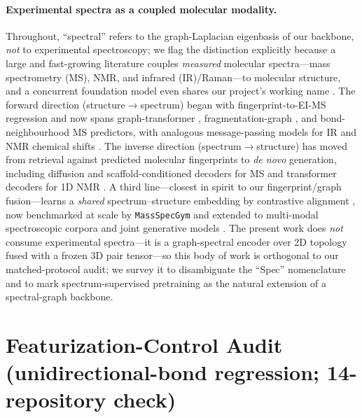 \documentclass[sigconf,nonacm,anonymous,review]{acmart}
\begin{document}
\paragraph{Experimental spectra as a coupled molecular modality.}
Throughout, ``spectral'' refers to the graph-Laplacian eigenbasis of our backbone, \emph{not} to experimental spectroscopy; we flag the distinction explicitly because a large and fast-growing literature couples \emph{measured} molecular spectra---mass spectrometry (MS), NMR, and infrared (IR)/Raman---to molecular structure, and a concurrent foundation model even shares our project's working name \citep{shen2025specmol}. The forward direction (structure$\rightarrow$spectrum) began with fingerprint-to-EI-MS regression \citep{wei2019neims} and now spans graph-transformer \citep{young2024massformer}, fragmentation-graph \citep{goldman2024iceberg,murphy2023graffms,goldman2023scarf}, and bond-neighbourhood \citep{nowatzky2025fiora} MS predictors, with analogous message-passing models for IR \citep{mcgill2021chempropir} and NMR chemical shifts \citep{jonas2019rapidnmr,kwon2020nmrmpnn}. The inverse direction (spectrum$\rightarrow$structure) has moved from retrieval against predicted molecular fingerprints \citep{duhrkop2015csifingerid,goldman2023mist} to \emph{de novo} generation, including diffusion \citep{bohde2025diffms} and scaffold-conditioned \citep{wang2025madgen} decoders for MS and transformer decoders for 1D NMR \citep{hu2024nmrmultitask}. A third line---closest in spirit to our fingerprint/graph fusion---learns a \emph{shared} spectrum--structure embedding by contrastive alignment \citep{kalia2024jestr,kanakala2024spectra2structure}, now benchmarked at scale by \texttt{MassSpecGym} \citep{bushuiev2024massspecgym} and extended to multi-modal spectroscopic corpora \citep{alberts2024multimodalspec} and joint generative models \citep{wang2025diffspectra}. The present work does \emph{not} consume experimental spectra---it is a graph-spectral encoder over 2D topology fused with a frozen 3D pair tensor---so this body of work is orthogonal to our matched-protocol audit; we survey it to disambiguate the ``Spec'' nomenclature and to mark spectrum-supervised pretraining as the natural extension of a spectral-graph backbone.


\section{Featurization-Control Audit (unidirectional-bond regression; 14-repository check)}
\end{document}
